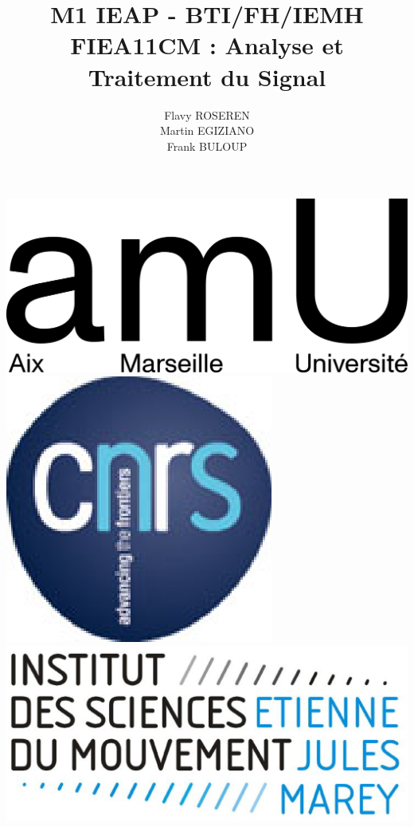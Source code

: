 \documentclass[a4paper,11pt]{beamer}
\title{M1 IEAP - BTI/FH/IEMH\\FIEA11CM : Analyse et Traitement du Signal}
\author{Flavy ROSEREN\\Martin EGIZIANO\\Frank BULOUP}
\institute{Aix Marseille Université\\Institut des Sciences du Mouvement}
\date{}
\begin{document}
 
 
\begin{frame}[plain] 
	\titlepage {}
	\vspace{1cm}	
	\includegraphics[scale=0.6]{images/LogoAMU.png}\hspace*{2cm}
	\includegraphics[scale=0.2]{images/LogoCNRS.eps}\hspace*{2cm}
	\includegraphics[scale=0.1]{images/LogoISM.eps}
\end{frame} 
\end{document}
